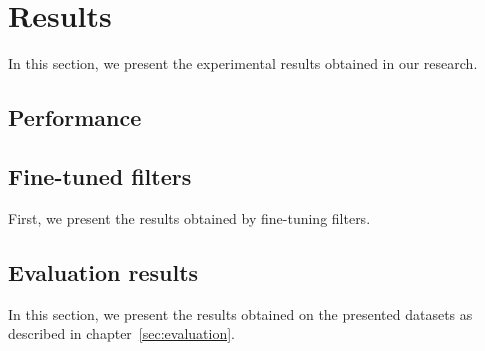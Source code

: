 
\chapter{Results}
In this section, we present the experimental results obtained in our
research.

\section{Performance}\label{sec:perfresults}


\section{Fine-tuned filters}
First, we present the results obtained by fine-tuning filters.

\section{Evaluation results}
In this section, we present the results obtained on the presented datasets
as described in chapter~\ref{sec:evaluation}.
